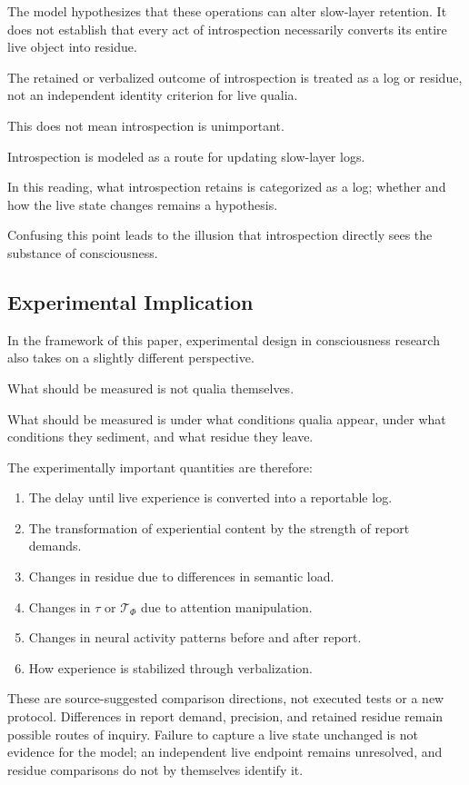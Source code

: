 The model hypothesizes that these operations can alter slow-layer retention. It does not establish that every act of introspection necessarily converts its entire live object into residue.

The retained or verbalized outcome of introspection is treated as a log or residue, not an independent identity criterion for live qualia.

This does not mean introspection is unimportant.

Introspection is modeled as a route for updating slow-layer logs.

In this reading, what introspection retains is categorized as a log; whether and how the live state changes remains a hypothesis.

Confusing this point leads to the illusion that introspection directly sees the substance of consciousness.

\subsection{Experimental Implication}


In the framework of this paper, experimental design in consciousness research also takes on a slightly different perspective.

What should be measured is not qualia themselves.

What should be measured is under what conditions qualia appear, under what conditions they sediment, and what residue they leave.

The experimentally important quantities are therefore:

\begin{enumerate}
\item The delay until live experience is converted into a reportable log.
\item The transformation of experiential content by the strength of report demands.
\item Changes in residue due to differences in semantic load.
\item Changes in $\tau$ or $\mathcal{T}_{\Phi}$ due to attention manipulation.
\item Changes in neural activity patterns before and after report.
\item How experience is stabilized through verbalization.
\end{enumerate}

These are source-suggested comparison directions, not executed tests or a new protocol. Differences in report demand, precision, and retained residue remain possible routes of inquiry. Failure to capture a live state unchanged is not evidence for the model; an independent live endpoint remains unresolved, and residue comparisons do not by themselves identify it.

